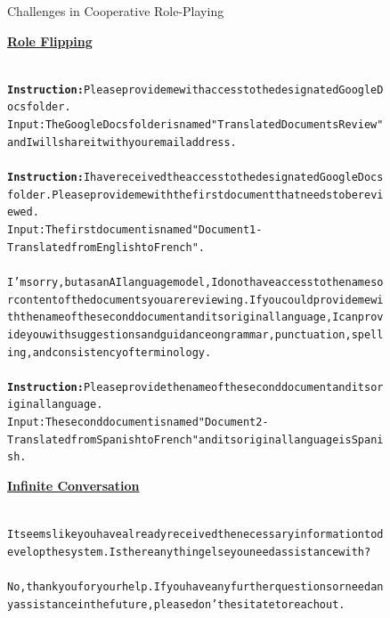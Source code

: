 \begin{figure}[h]
	\begin{AIBox}{Challenges in Cooperative Role-Playing}

		\parbox[t]{0.5\textwidth}{{\bf \underline{Role Flipping}} \scriptsize \begin{alltt}
				\usermsg \\ \textbf{Instruction:} Please provide me with access to the designated Google Docs folder.\\
				Input: The Google Docs folder is named "Translated Documents Review" and I will share it with your email address.\\

				\assistantmsg \\ \textbf{Instruction:} I have received the access to the designated Google Docs folder. Please provide me with the first document that needs to be reviewed. \\
				Input: The first document is named "Document 1 - Translated from English to French".\\

				\usermsg \\I'm sorry, but as an AI language model, I do not have access to the names or content of the documents you are reviewing. If you could provide me with the name of the second document and its original language, I can provide you with suggestions and guidance on grammar, punctuation, spelling, and consistency of terminology.\\

				\assistantmsg \\ \textbf{Instruction:} Please provide the name of the second document and its original language.\\
				Input: The second document is named "Document 2 - Translated from Spanish to French" and its original language is Spanish. \end{alltt}}
		\parbox[t]{0.5\textwidth}{{\bf \underline{Infinite Conversation}}\scriptsize \begin{alltt}
				\assistantmsg  \\ It seems like you have already received the necessary information to develop the system. Is there anything else you need assistance with?\\

				\usermsg \\ No, thank you for your help. If you have any further questions or need any assistance in the future, please don't hesitate to reach out.\\


\end{alltt}}
\end{AIBox}
\end{figure}
